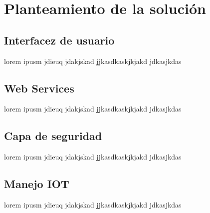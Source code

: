 \section{Planteamiento de la solución}
\subsection{Interfacez de usuario}
lorem ipusm jdieuq jdakjskad jjkasdkaskjkjakd jdkasjkdas
\subsection{Web Services}
lorem ipusm jdieuq jdakjskad jjkasdkaskjkjakd jdkasjkdas
\subsection{Capa de seguridad}
lorem ipusm jdieuq jdakjskad jjkasdkaskjkjakd jdkasjkdas
\subsection{Manejo IOT}
lorem ipusm jdieuq jdakjskad jjkasdkaskjkjakd jdkasjkdas
